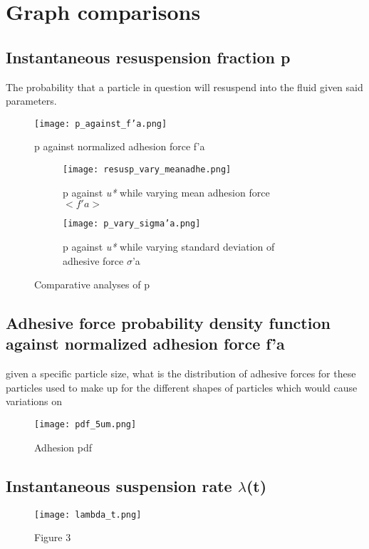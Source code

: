 \documentclass{article}
\begin{document}
\section{Graph comparisons}
\subsection{Instantaneous resuspension fraction p}
The probability that a particle in question will resuspend into the fluid given said parameters. 
\begin{figure}[htbp]
    \centering
    \texttt{[image: p\_against\_f'a.png]}
    \caption{p against normalized adhesion force f'a}
    \vspace{-10pt}
    \label{fig:1}
\end{figure}

\begin{figure}[H]
    \centering
    \begin{subfigure}{0.48\linewidth}
        \texttt{[image: resusp\_vary\_meanadhe.png]}
        \caption{p against \textit{u*} while varying mean adhesion force $<f'a>$}
    \end{subfigure}
    \hfill
    \begin{subfigure}{0.48\linewidth}
        \texttt{[image: p\_vary\_sigma'a.png]}
        \caption{p against \textit{u*} while varying standard deviation of adhesive force $\sigma$'a}
    \end{subfigure}
    \caption{Comparative analyses of p}
\end{figure}

\subsection{Adhesive force probability density function against normalized adhesion force f'a}
given a specific particle size, what is the distribution of adhesive forces for these particles 
used to make up for the different shapes of particles which would cause variations on 
\begin{figure}[htbp]
    \centering
    \texttt{[image: pdf\_5um.png]}
    \caption{Adhesion pdf}
    \vspace{-10pt}
    \label{fig:2}
\end{figure}

\newpage
\subsection{Instantaneous suspension rate $\lambda$(t)}
\begin{figure}[htbp]
    \centering
    \texttt{[image: lambda\_t.png]}
    \vspace{-10pt}
    \caption{Figure 3}
    \label{lambdat}
\end{figure}
\end{document}
